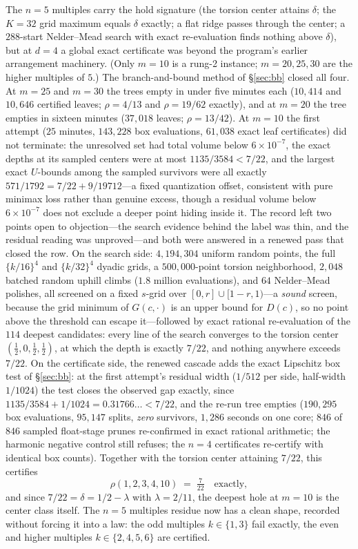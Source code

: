\documentclass[11pt,a4paper]{article}
\numberwithin{equation}{section}
\theoremstyle{plain}
\theoremstyle{definition}
\theoremstyle{remark}
\begin{document}
The $n=5$ multiples carry the hold signature (the torsion center
attains $\delta$; the $K=32$ grid maximum equals $\delta$ exactly; a
flat ridge passes through the center; a $288$-start Nelder--Mead search
with exact re-evaluation finds nothing above $\delta$), but at $d=4$ a
global exact certificate was beyond the program's earlier arrangement
machinery. (Only $m=10$ is a rung-2 instance; $m=20,25,30$ are the
higher multiples of $5$.) The branch-and-bound method of \S\ref{sec:bb}
closed all four. At $m=25$ and $m=30$ the trees empty in under five
minutes each ($10{,}414$ and $10{,}646$ certified leaves; $\rho=4/13$
and $\rho=19/62$ exactly), and at $m=20$ the tree empties in sixteen
minutes ($37{,}018$ leaves; $\rho=13/42$). At $m=10$ the first attempt
($25$ minutes, $143{,}228$ box evaluations, $61{,}038$ exact leaf
certificates) did not terminate: the unresolved set had total volume
below $6\times10^{-7}$, the exact depths at its sampled centers were at
most $1135/3584<7/22$, and the largest exact $U$-bounds among the
sampled survivors were all exactly $571/1792=7/22+9/19712$---a fixed
quantization offset, consistent with pure minimax loss rather than
genuine excess, though a residual volume below $6\times10^{-7}$ does not
exclude a deeper point hiding inside it. The record left two points
open to objection---the search evidence behind the label was thin, and
the residual reading was unproved---and both were answered in a renewed
pass that closed the row. On the search side: $4{,}194{,}304$ uniform
random points, the full $\{k/16\}^4$ and $\{k/32\}^4$ dyadic grids, a
$500{,}000$-point torsion neighborhood, $2{,}048$ batched random uphill
climbs ($1.8$ million evaluations), and $64$ Nelder--Mead polishes, all
screened on a fixed $s$-grid over $[0,r]\cup[1-r,1)$---a \emph{sound}
screen, because the grid minimum of $G(c,\cdot)$ is an upper bound for
$D(c)$, so no point above the threshold can escape it---followed by
exact rational re-evaluation of the $114$ deepest candidates: every
line of the search converges to the torsion center
$(\tfrac12,0,\tfrac12,\tfrac12)$, at which the depth is exactly $7/22$,
and nothing anywhere exceeds $7/22$. On the certificate side, the
renewed cascade adds the exact Lipschitz box test of \S\ref{sec:bb}:
at the first attempt's residual width ($1/512$ per side, half-width
$1/1024$) the test closes the observed gap exactly, since
$1135/3584+1/1024=0.31766\ldots<7/22$, and the re-run tree empties
($190{,}295$ box evaluations, $95{,}147$ splits, \emph{zero} survivors,
$1{,}286$ seconds on one core; $846$ of $846$ sampled float-stage
prunes re-confirmed in exact rational arithmetic; the harmonic negative
control still refuses; the $n=4$ certificates re-certify with identical
box counts). Together with the torsion center attaining $7/22$, this
certifies
\[
\rho(1,2,3,4,10)\;=\;\tfrac{7}{22}\quad\text{exactly},
\]
and since $7/22=\delta=1/2-\lambda$ with $\lambda=2/11$, the deepest
hole at $m=10$ is the center class itself. The $n=5$ multiples residue
now has a clean shape, recorded without forcing it into a law: the odd
multiples $k\in\{1,3\}$ fail exactly, the even and higher multiples
$k\in\{2,4,5,6\}$ are certified.
\end{document}
